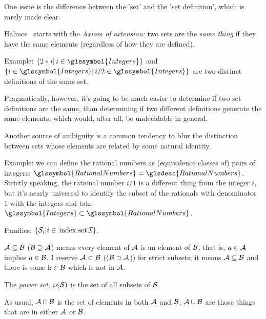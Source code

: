 One issue is the difference between the 'set' and the 
'set definition', which is rarely made clear.

Halmos~\cite{Halmos1960Naive} starts with the \emph{Axiom of
extension:} two sets are the \emph{same thing} if they have the
same elements (regardless of how they are defined).

Example: 
$\{ 2*i | \, i \in \glssymbol{Integers} \}$
and
$\{ i \in \glssymbol{Integers} |
 \, i/2 \in \glssymbol{Integers} \}$
are two distinct definitions of the same set. 
 
Pragmatically, however, it's going to be much easier to determine
if two set definitions are the same, than determining if two
different definitions generate the same elements, which would,
after all, be undecidable in general.

Another source of ambiguity is a common tendency to blur the 
distinction between sets whose elements are related by some natural
identity. 

Example: we can define the rational numbers as (equivalence
classes of) pairs of integers:
$\glssymbol{RationalNumbers} = \glsdesc{RationalNumbers}$.
Strictly speaking, the rational number $i/1$ is a different thing
from the integer $i$, but it's nearly universal to identify the
subset of the rationals with denominator $1$ with the integers and
take $\glssymbol{Integers} \subset \glssymbol{RationalNumbers}$.


Families: $\{ \mathcal{S}_{i} | i \in \, \text{index set} \, \mathcal{I}
\}$.



$\mathcal{A} \subseteq \mathcal{B}$ ($\mathcal{B} \supseteq \mathcal{A}$)
means
every element of $\mathcal{A}$ is an element of $\mathcal{B}$, 
that is, $a \in \mathcal{A}$ 
implies $a \in \mathcal{B}$.
I reserve $\mathcal{A} \subset \mathcal{B}$ (($\mathcal{B} \supset
\mathcal{A}$)) for strict subsets;
it means $\mathcal{A} \subseteq \mathcal{B}$
and there is some $\mathsf{b}\in\mathcal{B}$ which
is not in $\mathcal{A}$.



The \emph{power set}, ${\displaystyle \wp}(\mathcal{S})$ is the set 
of all subsets of
$\mathcal{S}$.

As usual, $\mathcal{A} \cap \mathcal{B}$ is the set of elements in both 
$\mathcal{A}$ and $\mathcal{B}$; $\mathcal{A} \cup \mathcal{B}$ are those things
that are in either $\mathcal{A}$ or $\mathcal{B}$.

